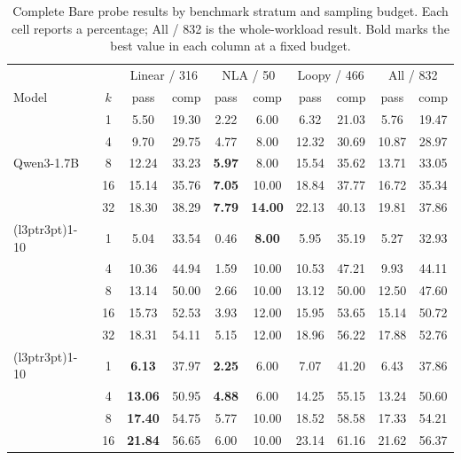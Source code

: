 \begin{table}[H]
\centering
\small
\renewcommand{\arraystretch}{0.86}
\caption{Complete Bare probe results by benchmark stratum and sampling
budget.  Each cell reports a percentage; All / 832 is the whole-workload
result.  Bold marks the best value in each column at a fixed budget.}
\label{tab:probe-complete}
\setlength{\tabcolsep}{2.4pt}
\begin{tabular}{lccccccccc}
\toprule
\rowcolor{algobg}
& & \multicolumn{2}{c}{Linear / 316} & \multicolumn{2}{c}{NLA / 50}
  & \multicolumn{2}{c}{Loopy / 466} & \multicolumn{2}{c}{All / 832} \\
\headercmidrules{\cmidrule(lr){3-4}\cmidrule(lr){5-6}\cmidrule(lr){7-8}\cmidrule(lr){9-10}}
\rowcolor{algobg}
Model & \(k\) & pass & comp & pass & comp & pass & comp & pass & comp
  \\
\midrule
\multirow{5}{*}{Qwen3-1.7B} & 1 & 5.50 & 19.30 & 2.22 & 6.00 & 6.32 & 21.03 & 5.76 & 19.47 \\
 & 4  & 9.70 & 29.75 & 4.77 & 8.00 & 12.32 & 30.69 & 10.87 & 28.97 \\
 & 8  & 12.24 & 33.23 & \textbf{5.97} & 8.00 & 15.54 & 35.62 & 13.71 & 33.05 \\
 & 16 & 15.14 & 35.76 & \textbf{7.05} & 10.00 & 18.84 & 37.77 & 16.72 & 35.34 \\
 & 32 & 18.30 & 38.29 & \textbf{7.79} & \textbf{14.00} & 22.13 & 40.13 & 19.81 & 37.86 \\
\cmidrule(l{3pt}r{3pt}){1-10}
\multirow{5}{*}{Qwen3-4B} & 1 & 5.04 & 33.54 & 0.46 & \textbf{8.00} & 5.95 & 35.19 & 5.27 & 32.93 \\
 & 4  & 10.36 & 44.94 & 1.59 & 10.00 & 10.53 & 47.21 & 9.93 & 44.11 \\
 & 8  & 13.14 & 50.00 & 2.66 & 10.00 & 13.12 & 50.00 & 12.50 & 47.60 \\
 & 16 & 15.73 & 52.53 & 3.93 & 12.00 & 15.95 & 53.65 & 15.14 & 50.72 \\
 & 32 & 18.31 & 54.11 & 5.15 & 12.00 & 18.96 & 56.22 & 17.88 & 52.76 \\
\cmidrule(l{3pt}r{3pt}){1-10}
\multirow{5}{*}{Qwen3-8B} & 1 & \textbf{6.13} & 37.97 & \textbf{2.25} & 6.00 & 7.07 & 41.20 & 6.43 & 37.86 \\
 & 4  & \textbf{13.06} & 50.95 & \textbf{4.88} & 6.00 & 14.25 & 55.15 & 13.24 & 50.60 \\
 & 8  & \textbf{17.40} & 54.75 & 5.77 & 10.00 & 18.52 & 58.58 & 17.33 & 54.21 \\
 & 16 & \textbf{21.84} & 56.65 & 6.00 & 10.00 & 23.14 & 61.16 & 21.62 & 56.37 \\

\end{tabular}
\end{table}
